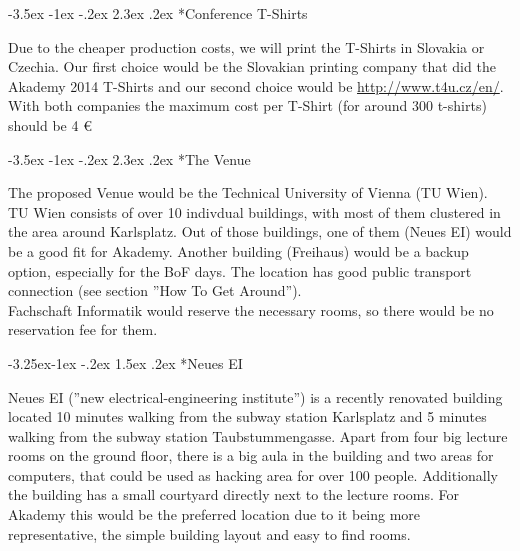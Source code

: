 \documentclass[10pt,a4paper]{article}
\makeatletter
\renewcommand\section{%
\@startsection{section}{1}{\z@}%
              {-3.5ex \@plus -1ex \@minus -.2ex}%
              {2.3ex \@plus.2ex}%
              {\color{kdelight}\sffamily\LARGE\bfseries}}
\renewcommand\subsection{%
\@startsection{subsection}{2}{\z@}%
              {-3.25ex\@plus -1ex \@minus -.2ex}%
              {1.5ex \@plus .2ex}%
              {\color{kdelight}\sffamily\Large\bfseries}}
\makeatother
\begin{document}
\cleardoublepage

\section*{Conference T-Shirts}
Due to the cheaper production costs, we will print the T-Shirts in Slovakia or Czechia. Our first choice would be the Slovakian printing company that did the Akademy 2014 T-Shirts and our second choice would be \url{http://www.t4u.cz/en/}. With both companies the maximum cost per T-Shirt (for around 300 t-shirts) should be 4 \euro{}

\cleardoublepage

\section*{The Venue}
The proposed Venue would be the Technical University of Vienna (TU Wien). TU Wien consists of over 10 indivdual buildings, with most of them clustered in the area around Karlsplatz. Out of those buildings, one of them (Neues EI) would be a good fit for Akademy. Another building (Freihaus) would be a backup option, especially for the BoF days. The location has good public transport connection (see section ''How To Get Around'').\\
Fachschaft Informatik would reserve the necessary rooms, so there would be no reservation fee for them.

\subsection*{Neues EI}

Neues EI (''new electrical-engineering institute'') is a recently renovated building located 10 minutes walking from the subway station Karlsplatz and 5 minutes walking from the subway station Taubstummengasse. Apart from four big lecture rooms on the ground floor, there is a big aula in the building and two areas for computers, that could be used as hacking area for over 100 people. Additionally the building has a small courtyard directly next to the lecture rooms. For Akademy this would be the preferred location due to it being more representative, the simple building layout and easy to find rooms.

\vspace{10pt}
\end{document}
